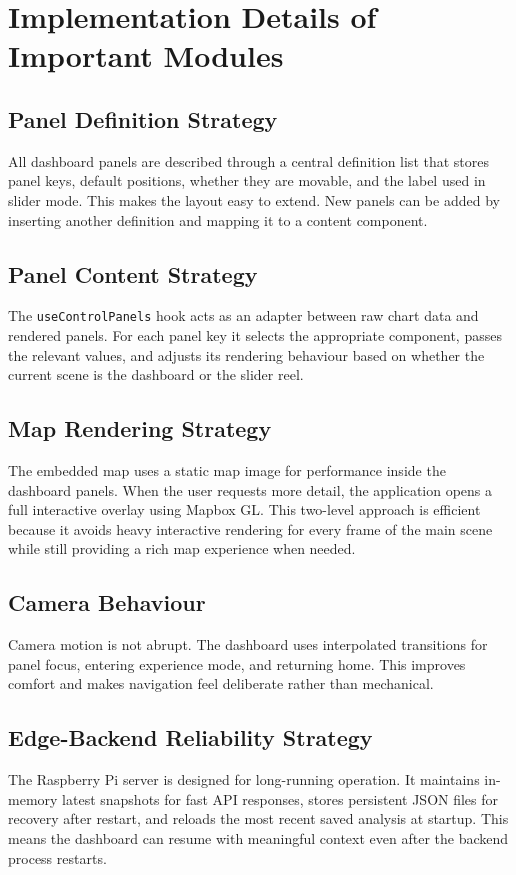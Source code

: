 \documentclass[conference]{IEEEtran}
\begin{document}
\section{Implementation Details of Important Modules}
\subsection{Panel Definition Strategy}
All dashboard panels are described through a central definition list that stores panel keys, default positions, whether they are movable, and the label used in slider mode. This makes the layout easy to extend. New panels can be added by inserting another definition and mapping it to a content component.

\subsection{Panel Content Strategy}
The \texttt{useControlPanels} hook acts as an adapter between raw chart data and rendered panels. For each panel key it selects the appropriate component, passes the relevant values, and adjusts its rendering behaviour based on whether the current scene is the dashboard or the slider reel.

\subsection{Map Rendering Strategy}
The embedded map uses a static map image for performance inside the dashboard panels. When the user requests more detail, the application opens a full interactive overlay using Mapbox GL. This two-level approach is efficient because it avoids heavy interactive rendering for every frame of the main scene while still providing a rich map experience when needed.

\subsection{Camera Behaviour}
Camera motion is not abrupt. The dashboard uses interpolated transitions for panel focus, entering experience mode, and returning home. This improves comfort and makes navigation feel deliberate rather than mechanical.

\subsection{Edge-Backend Reliability Strategy}
The Raspberry Pi server is designed for long-running operation. It maintains in-memory latest snapshots for fast API responses, stores persistent JSON files for recovery after restart, and reloads the most recent saved analysis at startup. This means the dashboard can resume with meaningful context even after the backend process restarts.
\end{document}
